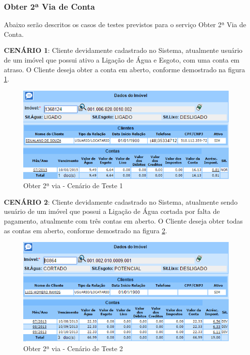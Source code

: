 \subsubsection{Obter 2ª Via de Conta}
Abaixo serão descritos os casos de testes previstos para o serviço Obter 2ª Via de Conta.
\begin{flushleft}
	\begin{description}
		\item \textbf{CENÁRIO 1}: Cliente devidamente cadastrado no Sistema, atualmente usuário de um imóvel que possui ativo a Ligação de Água e Esgoto, com uma conta em atraso. O Cliente deseja obter a conta em aberto, conforme demostrado na figura \ref{figura:2ViaCenario1}.
		\begin{figure}[H]
			\centering
			\caption{Obter 2ª via - Cenário de Teste 1}
			\label{figura:2ViaCenario1}
			\includegraphics{figuras/cenarios/segunda_via/cenario_1.PNG}
		\end{figure}
	\end{description}
	
	\begin{description}
		\item \textbf{CENÁRIO 2}: Cliente devidamente cadastrado no Sistema, atualmente sendo usuário de um imóvel que possui a Ligação de Água cortada por falta de pagamento, atualmente com três contas em aberto. O Cliente deseja obter todas as contas em aberto, conforme demostrado na figura \ref{figura:2ViaCenario2}.
		\begin{figure}[H]
			\centering
			\caption{Obter 2ª via - Cenário de Teste 2}
			\label{figura:2ViaCenario2}
			\includegraphics{figuras/cenarios/segunda_via/cenario_2.PNG}
			\legend {\fontsize{10}{12}\selectfont {Fonte: Autoria Própria}.}	
		\end{figure}
	\end{description}
	

\end{flushleft}
